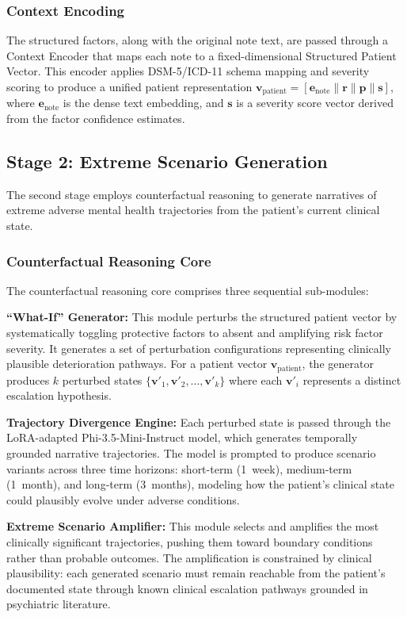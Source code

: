 \documentclass[conference]{IEEEtran}
\begin{document}
\subsubsection{Context Encoding}
The structured factors, along with the original note text, are passed through a Context Encoder that maps each note to a fixed-dimensional Structured Patient Vector. This encoder applies DSM-5/ICD-11 schema mapping and severity scoring to produce a unified patient representation $\mathbf{v}_{\text{patient}} = [\mathbf{e}_{\text{note}} \| \mathbf{r} \| \mathbf{p} \| \mathbf{s}]$, where $\mathbf{e}_{\text{note}}$ is the dense text embedding, and $\mathbf{s}$ is a severity score vector derived from the factor confidence estimates.

\subsection{Stage 2: Extreme Scenario Generation}

The second stage employs counterfactual reasoning to generate narratives of extreme adverse mental health trajectories from the patient's current clinical state.

\subsubsection{Counterfactual Reasoning Core}
The counterfactual reasoning core comprises three sequential sub-modules:

\textbf{``What-If'' Generator:} This module perturbs the structured patient vector by systematically toggling protective factors to absent and amplifying risk factor severity. It generates a set of perturbation configurations representing clinically plausible deterioration pathways. For a patient vector $\mathbf{v}_{\text{patient}}$, the generator produces $k$ perturbed states $\{\mathbf{v}'_1, \mathbf{v}'_2, \ldots, \mathbf{v}'_k\}$ where each $\mathbf{v}'_i$ represents a distinct escalation hypothesis.

\textbf{Trajectory Divergence Engine:} Each perturbed state is passed through the LoRA-adapted Phi-3.5-Mini-Instruct model, which generates temporally grounded narrative trajectories. The model is prompted to produce scenario variants across three time horizons: short-term (1~week), medium-term (1~month), and long-term (3~months), modeling how the patient's clinical state could plausibly evolve under adverse conditions.

\textbf{Extreme Scenario Amplifier:} This module selects and amplifies the most clinically significant trajectories, pushing them toward boundary conditions rather than probable outcomes. The amplification is constrained by clinical plausibility: each generated scenario must remain reachable from the patient's documented state through known clinical escalation pathways grounded in psychiatric literature.
\end{document}
